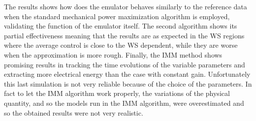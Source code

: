 The results shows how does the emulator behaves similarly to the reference data when the standard mechanical power maximization algorithm is employed, validating the function of the emulator itself. The second algorithm shows its partial effectiveness meaning that the results are as expected in the WS regions where the average control is close to the WS dependent, while they are worse when the approximation is more rough. Finally, the IMM method shows promising results in tracking the time evolutions of the variable parameters and extracting more electrical energy than the case with constant gain. Unfortunately this last simulation is not very reliable because of the choice of the parameters. In fact to let the IMM algorithm work properly, the variations of the physical quantity, and so the models run in the IMM algorithm, were overestimated and so the obtained results were not very realistic. 